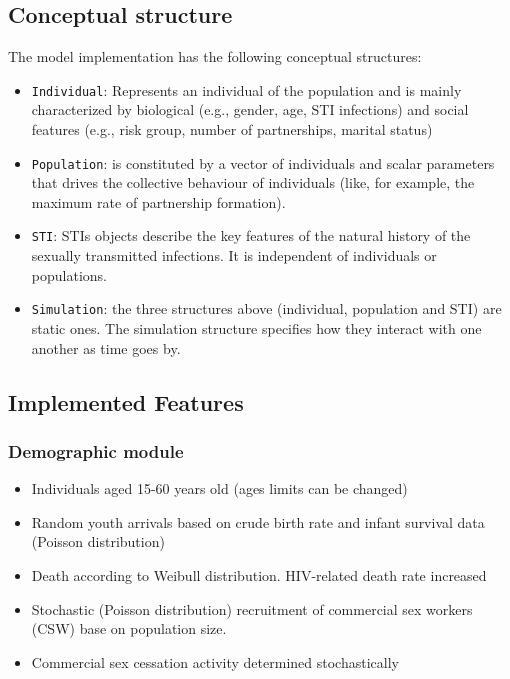 \documentclass[11pt, onecolumn]{article}
\newcommand{\ttt}[1]{\texttt{#1}}
\begin{document}
\begin{footnotesize}


\subsection{Conceptual structure}

The model implementation has the following conceptual structures:
\begin{itemize}
\item  \ttt{Individual}: Represents an individual of the population and is mainly characterized by biological (e.g., gender, age, STI infections) and social features (e.g., risk group, number of partnerships, marital status)
\item \ttt{Population}:  is constituted by a vector of individuals and scalar parameters that drives the collective behaviour of individuals (like, for example, the maximum rate of partnership formation).
\item \ttt{STI}: STIs objects describe the key features of the natural history of the sexually transmitted infections. It is independent of individuals or populations.
\item \ttt{Simulation}: the three structures above (individual, population and STI) are static ones. The simulation structure specifies how they interact with one another as time goes by.
\end{itemize}





\subsection{Implemented Features}

\subsubsection*{Demographic module}
\begin{itemize}
\item Individuals aged 15-60 years old (ages limits can be changed)
\item Random youth arrivals based on crude birth rate and infant survival data (Poisson distribution)
\item Death according to Weibull distribution. HIV-related death rate increased
\item Stochastic (Poisson distribution) recruitment of commercial sex workers (CSW) base on population size. 
\item Commercial sex cessation activity determined stochastically
\end{itemize}


\end{footnotesize}
\end{document}

